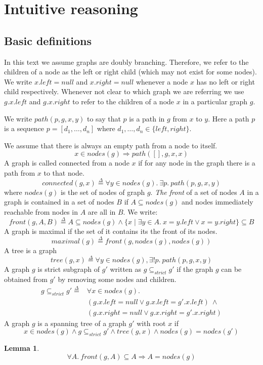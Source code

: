 \documentclass[]{scrartcl}
\newtheorem{lemma}{Lemma}
\newcommand{\defeq}{\overset{\Delta}{=}}
\newcommand{\path}{\mathit{path}}
\newcommand{\connected}{\mathit{connected}}
\newcommand{\nodes}{\mathit{nodes}}
\newcommand{\front}{\mathit{front}}
\newcommand{\maximal}{\mathit{maximal}}
\newcommand{\Left}{\mathit{left}}
\newcommand{\Right}{\mathit{right}}
\newcommand{\tree}{\mathit{tree}}
\newcommand{\Null}{\mathit{null}}
\newcommand{\strictSG}{\subseteq_{\mathit{strict}}}
\begin{document}
\section{Intuitive reasoning}\label{sect:int:reas}
\subsection{Basic definitions}
In this text we assume graphs are doubly branching.
Therefore, we refer to the children of a node as the left or right child (which may not exist for some nodes).
We write $x.\Left = \Null$ and $x.\Right = \Null$ whenever a node $x$ has no left or right child respectively.
Whenever not clear to which graph we are referring we use $g.x.\Left$ and $g.x.\Right$ to refer to the children of a node $x$ in a particular graph $g$.

We write $\path(p, g, x, y)$ to say that $p$ is a path in $g$ from $x$ to $y$.
Here a path $p$ is a sequence
$p = [d_1, \dots, d_n ]$ where $d_1,\dots, d_n \in \{\Left, \Right\}$.

We assume that there is always an empty path from a node to itself.
\[
x \in \nodes(g) \Rightarrow \path([], g, x, x)
\]
A graph is called connected from a node $x$ if for any node in the graph there is a path from $x$ to that node.
\[
\connected(g, x) \defeq \forall y \in \nodes(g).~ \exists p.~\path(p, g, x, y)
\]
where $\nodes(g)$ is the set of nodes of graph $g$.
\emph{The front} of a set of nodes $A$ in a graph is contained in
a set of nodes $B$ if $A \subseteq \nodes(g)$ and nodes immediately reachable
from nodes in $A$ are all in $B$. We write:
\[
\front(g, A, B) \defeq A \subseteq \nodes(g) \land
\{x \mid \exists y \in A.~x = y.\Left \lor x = y.\Right \} \subseteq B
\]
A graph is maximal if the set of it contains its the front of its nodes.
\[
\maximal(g) \defeq \front(g, \nodes(g), \nodes(g))
\]
A tree is a graph
\[
\tree(g, x) \defeq \forall y \in \nodes(g), \exists! p.~\path(p, g, x, y)
\]
A graph $g$ is strict subgraph of $g'$ written as $g \strictSG g'$
if the graph $g$ can be obtained from $g'$ by removing some nodes and children.
\[
\begin{array}{ll}
g \strictSG g' \defeq & \forall x \in \nodes(g).\\
& (g.x.\Left = \Null \lor g.x.\Left = g'.x.\Left)~\land \\
& (g.x.\Right = \Null \lor g.x.\Right = g'.x.\Right)
\end{array}
\]
A graph $g$ is a spanning tree of a graph $g'$ with root $x$ if
\[
x \in \nodes(g) \land g \strictSG g' \land \tree(g, x) \land \nodes(g) = \nodes(g')
\]
\begin{lemma}\label{lem:in_front_nodes}
\[
\forall A.~ \front(g, A) \subseteq A \Rightarrow A = \nodes(g)
\]
\end{lemma}
\end{document}
